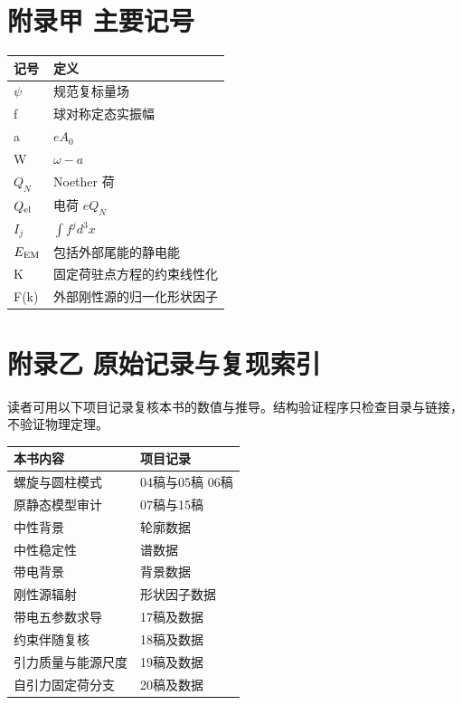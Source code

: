 \documentclass[UTF8,fontset=fandol,11pt]{ctexart}
\begin{document}
\section*{附录甲 主要记号}

\begin{center}\small
\begin{tabularx}{\textwidth}{>{\raggedright\arraybackslash}X>{\raggedright\arraybackslash}X}
\toprule
记号 & 定义 \\
\midrule
\(\psi\) & 规范复标量场 \\
f & 球对称定态实振幅 \\
a & \(eA_0\) \\
W & \(\omega-a\) \\
\(Q_N\) & Noether 荷 \\
\(Q_{\rm el}\) & 电荷 \(eQ_N\) \\
\(I_j\) & \(\int f^j d^3x\) \\
\(E_{\rm EM}\) & 包括外部尾能的静电能 \\
K & 固定荷驻点方程的约束线性化 \\
F(k) & 外部刚性源的归一化形状因子 \\
\bottomrule
\end{tabularx}
\end{center}

\section*{附录乙 原始记录与复现索引}

读者可用以下项目记录复核本书的数值与推导。结构验证程序只检查目录与链接，不验证物理定理。

\begin{center}\small
\begin{tabularx}{\textwidth}{>{\raggedright\arraybackslash}X>{\raggedright\arraybackslash}X}
\toprule
本书内容 & 项目记录 \\
\midrule
螺旋与圆柱模式 & 04稿与05稿 06稿 \\
原静态模型审计 & 07稿与15稿 \\
中性背景 & 轮廓数据 \\
中性稳定性 & 谱数据 \\
带电背景 & 背景数据 \\
刚性源辐射 & 形状因子数据 \\
带电五参数求导 & 17稿及数据 \\
约束伴随复核 & 18稿及数据 \\
引力质量与能源尺度 & 19稿及数据 \\
自引力固定荷分支 & 20稿及数据 \\
\bottomrule
\end{tabularx}
\end{center}
\end{document}
